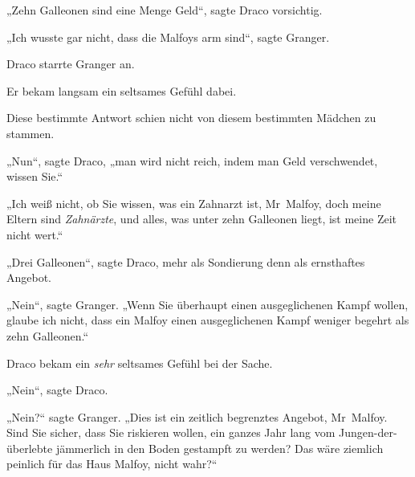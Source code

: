 „Zehn Galleonen sind eine Menge Geld“, sagte Draco vorsichtig.

„Ich wusste gar nicht, dass die Malfoys arm sind“, sagte Granger.

Draco starrte Granger an.

Er bekam langsam ein seltsames Gefühl dabei.

Diese bestimmte Antwort schien nicht von diesem bestimmten Mädchen zu stammen.

„Nun“, sagte Draco, „man wird nicht reich, indem man Geld verschwendet, wissen Sie.“

„Ich weiß nicht, ob Sie wissen, was ein Zahnarzt ist, Mr~Malfoy, doch meine Eltern sind \emph{Zahnärzte}, und alles, was unter zehn Galleonen liegt, ist meine Zeit nicht wert.“

„Drei Galleonen“, sagte Draco, mehr als Sondierung denn als ernsthaftes Angebot.

„Nein“, sagte Granger.
„Wenn Sie überhaupt einen ausgeglichenen Kampf wollen, glaube ich nicht, dass ein Malfoy einen ausgeglichenen Kampf weniger begehrt als zehn Galleonen.“

Draco bekam ein \emph{sehr} seltsames Gefühl bei der Sache.

„Nein“, sagte Draco.

„Nein?“ sagte Granger.
„Dies ist ein zeitlich begrenztes Angebot, Mr~Malfoy. Sind Sie sicher, dass Sie riskieren wollen, ein ganzes Jahr lang vom Jungen-der-überlebte jämmerlich in den Boden gestampft zu werden? Das wäre ziemlich peinlich für das Haus Malfoy, nicht wahr?“

